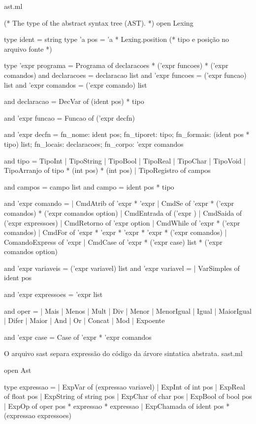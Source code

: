 \documentclass[12pt,a4paper,twoside]{article}
\begin{document}
ast.ml
\begin{terminal}
(* The type of the abstract syntax tree (AST). *)
open Lexing

type ident = string
type 'a pos =  'a * Lexing.position (* tipo e posição no arquivo fonte *)

type 'expr programa = Programa of declaracoes * ('expr funcoes) * ('expr comandos)
and declaracoes = declaracao list
and 'expr funcoes = ('expr funcao) list
and 'expr comandos = ('expr comando) list

and declaracao = DecVar of (ident pos) * tipo

and 'expr funcao = Funcao of ('expr decfn)

and 'expr decfn =  {
  fn_nome:    ident pos;
  fn_tiporet: tipo;
  fn_formais: (ident pos * tipo) list;
  fn_locais:  declaracoes;
  fn_corpo:   'expr comandos
}

and tipo = TipoInt
         | TipoString
         | TipoBool
         | TipoReal
         | TipoChar
         | TipoVoid
         | TipoArranjo of tipo * (int pos) * (int pos)
         | TipoRegistro of campos

and campos = campo list
and campo = ident pos * tipo

and 'expr comando =
  | CmdAtrib of 'expr * 'expr
  | CmdSe of 'expr * ('expr comandos) * ('expr comandos option)
  | CmdEntrada of ('expr )
  | CmdSaida of ('expr expressoes)
  | CmdRetorno of 'expr option
  | CmdWhile of 'expr * ('expr comandos)
  | CmdFor of   'expr * 'expr * 'expr * 'expr * ('expr comandos)
  | ComandoExpress of   'expr
  | CmdCase of  'expr * ('expr case) list * ('expr comandos option)


and 'expr variaveis = ('expr variavel) list
and 'expr variavel =
  | VarSimples of ident pos

and 'expr expressoes = 'expr list

and oper =
  | Mais
  | Menos
  | Mult
  | Div
  | Menor
  | MenorIgual
  | Igual
  | MaiorIgual
  | Difer
  | Maior
  | And
  | Or
  | Concat
  | Mod
  | Expoente

and 'expr case  = Case of 'expr * 'expr comandos
\end{terminal}

O arquivo sast separa expressão do código da árvore sintatica abstrata. \newline
sast.ml
\begin{terminal}
open Ast

type expressao =
  | ExpVar of (expressao variavel)
  | ExpInt of int pos
  | ExpReal of float pos
  | ExpString of string pos
  | ExpChar of char pos
  | ExpBool of bool pos
  | ExpOp of oper pos * expressao * expressao
  | ExpChamada of ident pos * (expressao expressoes)
\end{terminal}
\end{document}
